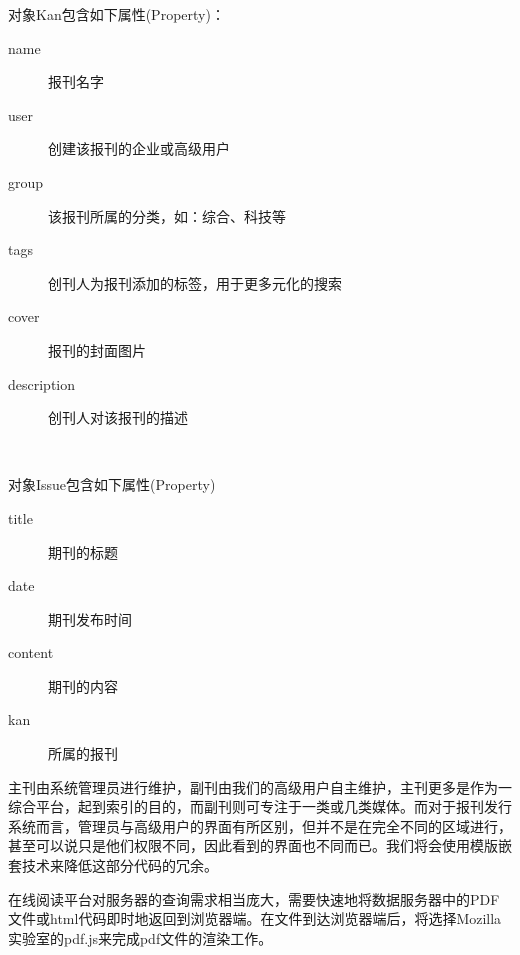 \noindent
对象Kan包含如下属性(Property)：
\begin{description}
	\item[name] 报刊名字
	\item[user] 创建该报刊的企业或高级用户
	\item[group] 该报刊所属的分类，如：综合、科技等
	\item[tags] 创刊人为报刊添加的标签，用于更多元化的搜索
	\item[cover] 报刊的封面图片
	\item[description] 创刊人对该报刊的描述
\end{description}
\par~

\noindent
对象Issue包含如下属性(Property)
\begin{description}
	\item[title] 期刊的标题
	\item[date]  期刊发布时间
	\item[content] 期刊的内容
	\item[kan] 所属的报刊
\end{description}
\par

主刊由系统管理员进行维护，副刊由我们的高级用户自主维护，主刊更多是作为一综合平台，起到索引的目的，而副刊则可专注于一类或几类媒体。而对于报刊发行系统而言，管理员与高级用户的界面有所区别，但并不是在完全不同的区域进行，甚至可以说只是他们权限不同，因此看到的界面也不同而已。我们将会使用模版嵌套技术来降低这部分代码的冗余。

在线阅读平台对服务器的查询需求相当庞大，需要快速地将数据服务器中的PDF文件或html代码即时地返回到浏览器端。在文件到达浏览器端后，将选择Mozilla实验室的pdf.js来完成pdf文件的渲染工作。

\clearpage






